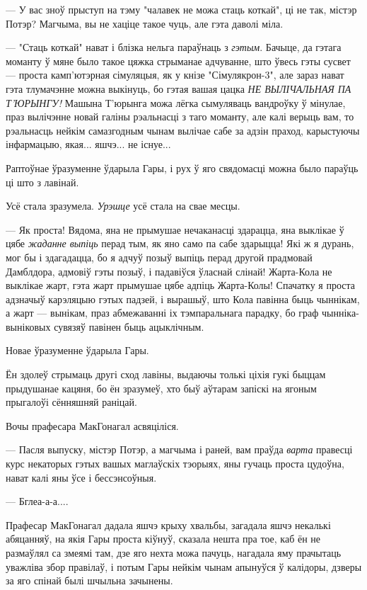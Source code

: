 --- У вас зноў прыступ на тэму "чалавек не можа стаць коткай", ці не так, містэр Потэр?
Магчыма, вы не хаціце такое чуць, але гэта даволі міла.

--- "Стаць коткай" нават і блізка нельга параўнаць з \emph{гэтым}. Бачыце, да 
гэтага моманту ў мяне было такое цяжка стрыманае адчуванне, што ўвесь 
гэты сусвет --- проста камп'ютэрная сімуляцыя, як у кнізе "Сімулякрон-3", але 
зараз нават гэта тлумачэнне можна выкінуць, бо гэтая 
вашая цацка \emph{НЕ ВЫЛІЧАЛЬНАЯ ПА Т'ЮРЫНГУ!} Машына Т'юрынга можа лёгка сымуляваць
вандроўку ў мінулае, праз вылічэнне новай галіны рэальнасці з таго моманту,
але калі верыць вам, то рэальнасць нейкім самазгодным чынам вылічае сабе 
за адзін праход, карыстуючы інфармацыю, якая... яшчэ... не існуе... 

Раптоўнае ўразуменне ўдарыла Гары, і рух ў яго свядомасці можна было 
параўць ці што з лавінай.

Усё стала зразумела. \emph{Урэшце} усё стала на свае месцы.

---  Як проста! Вядома, яна не прымушае нечаканасці 
здарацца, яна выклікае ў цябе \emph{жаданне выпіць} перад тым, як яно само па сабе здарыцца!
Які ж я дурань, мог бы і здагадацца, бо я адчуў позыў выпіць перад другой прадмовай Дамблдора,
адмовіў гэты позыў, і падавіўся ўласнай слінай! Жарта-Кола не выклікае жарт, гэта жарт прымушае 
цябе адпіць Жарта-Колы! Спачатку я проста адзначыў карэляцыю гэтых падзей, і вырашыў, што
Кола павінна быць чыннікам, а жарт --- вынікам, праз абмежаванні іх тэмпаральнага парадку,
бо граф чынніка-выніковых сувязяў павінен быць ацыклічным.

Новае ўразуменне ўдарыла Гары.

Ён здолеў стрымаць другі сход лавіны, выдаючы толькі ціхія гукі быццам прыдушанае кацяня,
бо ён зразумеў, хто быў аўтарам запіскі на ягоным прыгалоўі сённяшняй раніцай.

Вочы прафесара МакГонагал асвяціліся.

--- Пасля выпуску, містэр Потэр, а магчыма і раней, вам праўда  \emph{варта}
правесці курс некаторых гэтых вашых маглаўскіх тэорыях, яны гучаць проста цудоўна,
нават калі яны ўсе і бессэнсоўныя.

--- Бглеа-а-а....

Прафесар МакГонагал дадала яшчэ крыху хвальбы, загадала яшчэ некалькі абяцанняў, на 
якія Гары проста кіўнуў, сказала нешта пра тое, каб ён не размаўлял са змеямі там,
дзе яго нехта можа пачуць, нагадала яму прачытаць уважліва збор правілаў, і потым 
Гары нейкім чынам апынуўся ў калідоры, дзверы за яго спінай былі шчыльна зачынены. 

